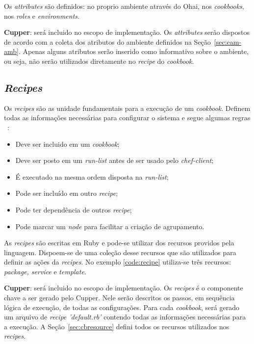 Os \textit{attributes} são definidos: no proprio ambiente através do Ohai, nos \textit{cookbooks},
nos \textit{roles} e \textit{environments}.

\textbf{Cupper}: será incluido no escopo de implementação. Os \textit{attributes} serão dispostos
de acordo com a coleta dos atributos do ambiente definidos na Seção~\ref{sec:cam-amb}.
Apenas alguns atributos serão inserido como informativo sobre o ambiente, ou seja,
não serão utilizados diretamente no \textit{recipe} do \textit{cookbook}.

\subsection{\textit{Recipes}}
\label{sec:lev-rec-rec}

Os \textit{recipes} são as unidade fundamentais para a execução de um \textit{cookbook}. Definem
todas as informações necessárias para configurar o sistema e segue algumas regras
~\cite{chefdoc:2016}:

\begin{itemize}
  \item Deve ser incluido em um \textit{cookbook};
  \item Deve ser posto em um \textit{run-list} antes de ser usado pelo \textit{chef-client};
  \item É executado na mesma ordem disposta na \textit{run-list};
  \item Pode ser incluído em outro \textit{recipe};
  \item Pode ter dependência de outros \textit{recipe};
  \item Pode marcar um \textit{node} para facilitar a criação de agrupamento.
\end{itemize}

As \textit{recipes} são escritas em Ruby e pode-se utilizar dos recursos providos
pela linguagem. Dispoem-se de uma coleção desse recursos que são utilizados
para definir as ações da \textit{recipes}. No exemplo \ref{code:recipe} utiliza-se
três recursos: \textit{package, service} e \textit{template}.

\begin{minipage}{.90\textwidth}
  \lstset{style=shell}
  
\end{minipage}

\textbf{Cupper}: será incluido no escopo de implementação. Os \textit{recipes} é o componente chave a
ser gerado pelo Cupper. Nele serão descritos os passos, em sequência lógica de execução,
de todas as configurações. Para cada \textit{cookbook}, será gerado um arquivo de 
\textit{recipe 'default.rb'} contendo todas as informações necessárias para a execução.
A Seção~\ref{sec:cbresource} defini todos os recursos utilizados nos \textit{recipes}.

